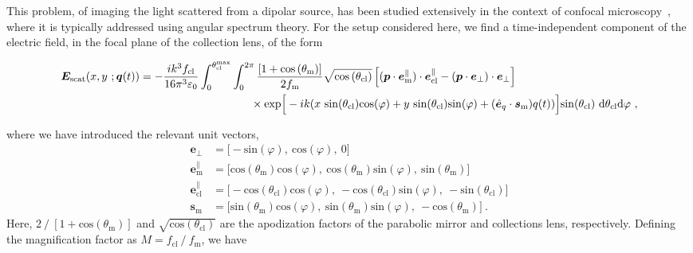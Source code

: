 \documentclass[%
 reprint,
 amsmath,amssymb,
 aps,
pra,
]{revtex4-2}
\begin{document}
This problem, of imaging the light scattered from a dipolar source, has been studied extensively in the context of confocal microscopy~\cite{lieb_high_2001}, where it is typically addressed using angular spectrum theory. For the setup considered here, we find a time-independent component of the electric field, in the focal plane of the collection lens, of the form
\begin{widetext}
\begin{align}
    \boldsymbol{E}_{\mathrm{scat}}(x, y~; \boldsymbol{q}(t)) &= -\frac{ik^{3}f_{\mathrm{cl}}}{16\pi^{3}\varepsilon_{0}} \int^{\theta_{\mathrm{cl}}^{\mathrm{max}}}_{0} \int^{2\pi}_{0} \frac{[1+\mathrm{cos}\left(\theta_{\mathrm{m}}\right)]}{2f_{\mathrm{m}}} \sqrt{\mathrm{cos}\left(\theta_{\mathrm{cl}}\right)} \left[(\boldsymbol{p}\cdot\boldsymbol{e}_{\mathrm{m}}^{\parallel})\cdot\boldsymbol{e}_{\mathrm{cl}}^{\parallel} - (\boldsymbol{p}\cdot\boldsymbol{e}_{\perp})\cdot\boldsymbol{e}_{\perp}\right] \nonumber  \\ 
    &\hspace{35mm} \times\mathrm{exp}\Big[-ik(x~\mathrm{sin}(\theta_{\mathrm{cl}})\mathrm{cos}(\varphi) + y~\mathrm{sin}(\theta_{\mathrm{cl}})\mathrm{sin}(\varphi) + (\hat{\boldsymbol{e}}_{q}\cdot\boldsymbol{s}_{\mathrm{m}})q(t))\Big] \mathrm{sin}(\theta_{\mathrm{cl}})~\mathrm{d}\theta_{\mathrm{cl}}\mathrm{d}\varphi ~ , \label{FieldExpression}
\end{align}
\end{widetext}
where we have introduced the relevant unit vectors, 
\begin{align}
    \boldsymbol{e}_{\perp} &= \Big[-\mathrm{sin}(\varphi),~\mathrm{cos}(\varphi),~0\Big] \\
    \boldsymbol{e}_{\mathrm{m}}^{\parallel} &= \Big[\mathrm{cos}(\theta_{\mathrm{m}})\mathrm{cos}(\varphi),~\mathrm{cos}(\theta_{\mathrm{m}})\mathrm{sin}(\varphi),~\mathrm{sin}(\theta_{\mathrm{m}})\Big] \\
    \boldsymbol{e}_{\mathrm{cl}}^{\parallel} &= \Big[-\mathrm{cos}(\theta_{\mathrm{cl}})\mathrm{cos}(\varphi),~-\mathrm{cos}(\theta_{\mathrm{cl}})\mathrm{sin}(\varphi),~-\mathrm{sin}(\theta_{\mathrm{cl}})\Big] \\
    \boldsymbol{s}_{\mathrm{m}} &= \Big[\mathrm{sin}(\theta_{\mathrm{m}})\mathrm{cos}(\varphi),~\mathrm{sin}(\theta_{\mathrm{m}})\mathrm{sin}(\varphi),~-\mathrm{cos}(\theta_{\mathrm{m}})\Big]~.
\end{align}
Here, $2~/~[1+\mathrm{cos}(\theta_{\mathrm{m}})]$ and $\sqrt{\mathrm{cos}(\theta_{\mathrm{cl}})}$ are the apodization factors of the parabolic mirror and collections lens, respectively. Defining the magnification factor as $M=f_{\mathrm{cl}}~/~f_{\mathrm{m}}$, we have
\end{document}
